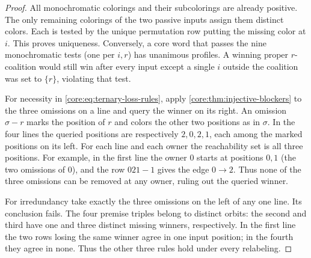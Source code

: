 \begin{proof}
All monochromatic colorings and their subcolorings are already positive.
The only remaining colorings of the two passive inputs assign them distinct colors. Each is tested by the
unique permutation row putting the missing color at $i$. This proves
uniqueness. Conversely, a core word that passes the nine monochromatic
tests (one per $i,r$) has unanimous profiles. A winning proper
$r$-coalition would still win after every input except a single
$i$ outside the coalition was set to $\{r\}$, violating that test.

For necessity in \eqref{core:eq:ternary-loss-rules}, apply
\cref{core:thm:injective-blockers} to the three omissions on a line
and query the winner on its right. An omission $\sigma-r$ marks the
position of $r$ and colors the other two positions as in $\sigma$.
In the four lines the queried positions are respectively $2,0,2,1$,
each among the marked positions on its left. For each line and each
owner the reachability set is all three positions. For example, in
the first line the owner $0$ starts at positions $0,1$ (the two
omissions of $0$), and the row $021-1$ gives the edge $0\to2$.
Thus none of the three omissions can be removed at any owner, ruling
out the queried winner.

For irredundancy take exactly the three omissions on the left of any
one line. Its conclusion fails. The four premise triples belong to
distinct orbits: the second and third have one and three distinct
missing winners, respectively. In the first line the two rows losing
the same winner agree in one input position; in the fourth they agree
in none. Thus the other three rules hold under every relabeling.


\end{proof}
